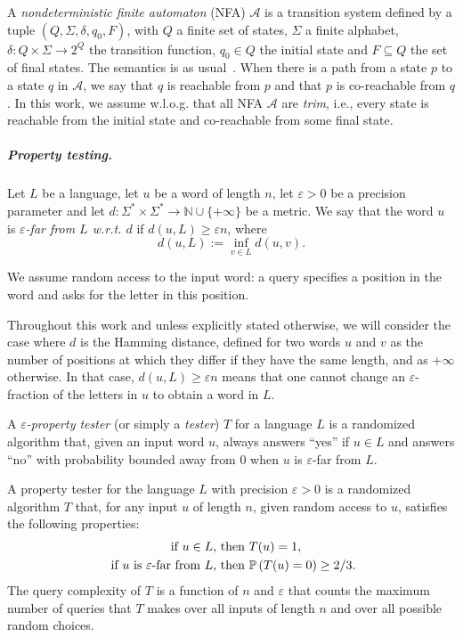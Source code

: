 \documentclass[letterpaper, USenglish, cleveref, autoref, thm-restate, numberwithinsect]{lipics-v2021}
\theoremstyle{theorem}
\theoremstyle{definition}
\newcommand{\Aa}{\mathcal{A}}
\newcommand{\eps}{\varepsilon}
\newcommand{\NN}{\mathbb{N}}
\newcommand{\pow}[1]{2^{#1}}
\newcommand{\PP}{\mathbb{P}}
\newcommand{\Prob}[2][]{\ifthenelse{\equal{#1}{}}{\PP}{\PP_{ #1 }}\left( #2 \right)}
\begin{document}
A \emph{nondeterministic finite automaton} (NFA) $\Aa$ is a transition system defined by a tuple $(Q, \Sigma, \delta, q_0, F)$, with $Q$ a finite set of states, $\Sigma$ a finite alphabet, $\delta : Q \times \Sigma \to \pow{Q}$ the transition function, $q_0 \in Q$ the initial state and $F \subseteq Q$ the set of final states. The semantics is as usual~\cite{Pin2021}.
When there is a path from a state $p$ to a state $q$ in $\Aa$, we say that $q$ is reachable from $p$ and that $p$ is co-reachable from $q$. 
In this work, we assume w.l.o.g. that all NFA $\Aa$ are \emph{trim}, i.e., every state is reachable from the initial state and co-reachable from some final state.

\subparagraph*{Property testing.} 

\begin{definition}\label{def:eps-far}
    Let $L$ be a language, let $u$ be a word of length $n$, let $\eps > 0$ be a precision parameter and let $d : \Sigma^*\times\Sigma^*\rightarrow \NN \cup\{+\infty\}$ be a metric.
	We say that the word $u$ is \emph{$\eps$-far from $L$ w.r.t. $d$} if $d(u, L) \ge \eps n$, where
    \[d(u, L) := \inf_{v\in L} d(u,v).\]  
\end{definition}
We assume random access to the input word: a query specifies a position in the word and asks for the letter in this position. 

Throughout this work and unless explicitly stated otherwise, we will consider the case where $d$ is the Hamming distance, defined for two words $u$ and $v$ as the number of positions at which they differ if they have the same length, and as $+\infty$ otherwise.
In that case, $d(u,L) \ge \eps n$ means that one cannot change an $\eps$-fraction of the letters in $u$ to obtain a word in $L$.

A \emph{$\eps$-property tester} (or simply a \emph{tester}) $T$ for a language $L$ is a randomized algorithm that, given an input word $u$, always answers ``yes'' if $u\in L$ and answers ``no'' with probability bounded away from 0 when $u$ is $\eps$-far from $L$. 

\begin{definition}\label{def:tester}
	A property tester for the language $L$ with precision $\eps > 0$ is a randomized algorithm $T$ that, for any input $u$ of length $n$, given random access to $u$, satisfies the following properties:
    \begin{align*}
        \text{ if } u\in L, & \text{ then } T(u) = 1, \\
        \text{ if $u$ is $\eps$-far from $L$}, & \text{ then } \Prob{T(u) = 0} \ge 2/3.
    \end{align*}
	The query complexity of $T$ is a function of $n$ and $\eps$ that counts the maximum number of queries that $T$ makes over all inputs of length $n$ and over all possible random choices.
\end{definition}
\end{document}
